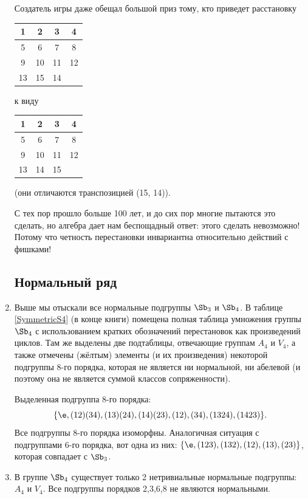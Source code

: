 \begin{enumerate}
Создатель игры даже обещал большой приз тому, кто приведет расстановку
\begin{center}
\begin{tabular}{|c|c|c|c|}
\hline
1 & 2 & 3 & 4 \\ \hline
5 & 6 & 7 & 8 \\ \hline
9 & 10 & 11 & 12 \\ \hline
13 &15 & 14 & \\ \hline
\end{tabular}
\quad к виду \quad
\begin{tabular}{|c|c|c|c|}
\hline
1 & 2 & 3 & 4 \\ \hline
5 & 6 & 7 & 8 \\ \hline
9 & 10 & 11 & 12 \\ \hline
13 &14 & 15 & \\ \hline
\end{tabular}
\end{center}
(они отличаются транспозицией (15, 14)).

С тех пор прошло больше 100 лет, и до сих пор многие пытаются это сделать, но алгебра дает нам беспощадный ответ: этого сделать невозможно! Потому что четность перестановки инвариантна относительно действий с фишками!

\subsection*{Нормальный ряд}

\item Выше мы отыскали все нормальные подгруппы $\Sb_3$ и $\Sb_4$. В таблице \ref{SymmetricS4} (в конце книги) помещена полная таблица умножения группы $\Sb_4$ с использованием кратких обозначений перестановок как произведений циклов. Там же выделены две подтаблицы, отвечающие группам $A_4$ и $V_4$, а также отмечены (жёлтым) элементы (и их произведения) некоторой подгруппы 8-го порядка, которая не является ни нормальной, ни абелевой (и поэтому она не является суммой классов сопряженности).

Выделенная подгруппа 8-го порядка:
$$\{\e, (12)(34), (13)(24), (14)(23), (12), (34), (1324), (1423)\}.
$$
Все подгруппы 8-го порядка изоморфны. Аналогичная ситуация с подгруппами 6-го порядка, вот одна из них:
$\{\e, (123), (132), (12), (13), (23) \}$, которая совпадает с $\Sb_3$.

\item В группе $\Sb_4$ существует только 2 нетривиальные нормальные подгруппы: $A_4$ и $V_4$. Все подгруппы порядков 2,3,6,8 не являются нормальными.


\end{enumerate}
